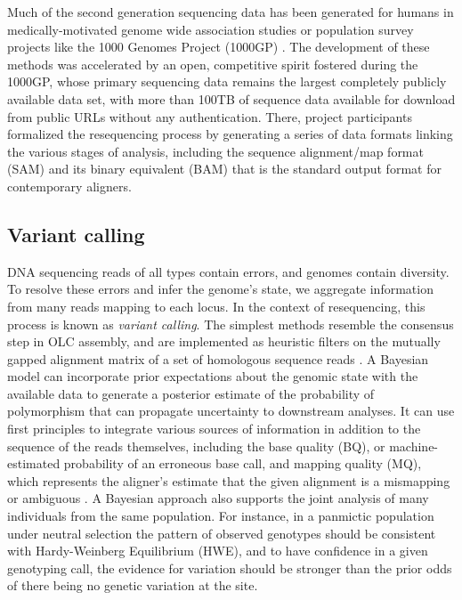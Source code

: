 \documentclass[a4paper,12pt,numbered,oneside]{Classes/PhDThesisPSnPDF}
\begin{document}
Much of the second generation sequencing data has been generated for humans in medically-motivated genome wide association studies \cite{uk10k2015uk10k} or population survey projects like the 1000 Genomes Project (1000GP) \cite{1000Gphase1,1000g2015}. %
The development of these methods was accelerated by an open, competitive spirit fostered during the 1000GP, whose primary sequencing data remains the largest completely publicly available data set, with more than 100TB of sequence data available for download from public URLs without any authentication.
There, project participants formalized the resequencing process by generating a series of data formats linking the various stages of analysis, including the sequence alignment/map format (SAM) and its binary equivalent (BAM) \cite{li2009sequence} that is the standard output format for contemporary aligners.


\subsection{Variant calling}

DNA sequencing reads of all types contain errors, and genomes contain diversity.
To resolve these errors and infer the genome's state, we aggregate information from many reads mapping to each locus.
In the context of resequencing, this process is known as \emph{variant calling}.
The simplest methods resemble the consensus step in OLC assembly, and are implemented as heuristic filters on the mutually gapped alignment matrix of a set of homologous sequence reads \cite{koboldt2009varscan}.
A Bayesian model can incorporate prior expectations about the genomic state with the available data to generate a posterior estimate of the probability of polymorphism that can propagate uncertainty to downstream analyses.
It can use first principles to integrate various sources of information in addition to the sequence of the reads themselves, including the base quality (BQ), or machine-estimated probability of an erroneous base call, and mapping quality (MQ), which represents the aligner's estimate that the given alignment is a mismapping or ambiguous \cite{li2011statistical}.
A Bayesian approach also supports the joint analysis of many individuals from the same population.
For instance, in a panmictic population under neutral selection the pattern of observed genotypes should be consistent with Hardy-Weinberg Equilibrium (HWE), and to have confidence in a given genotyping call, the evidence for variation should be stronger than the prior odds of there being no genetic variation at the site.
\end{document}
